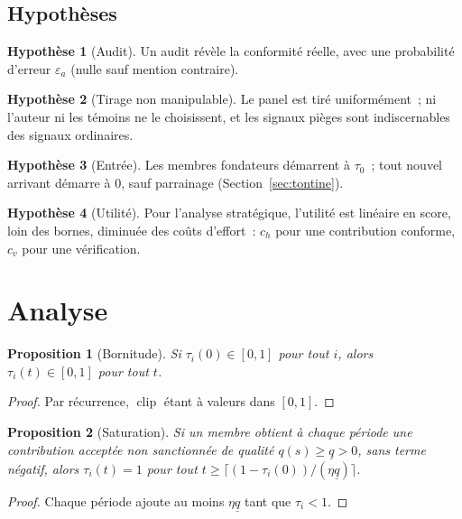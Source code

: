\documentclass[11pt,a4paper]{article}
\theoremstyle{plain}
\newtheorem{proposition}{Proposition}
\theoremstyle{definition}
\newtheorem{hypothese}{Hypothèse}
\theoremstyle{remark}
\newcommand{\clip}{\operatorname{clip}}
\newcommand{\1}{\mathbf{1}}
\begin{document}
\subsection{Hypothèses}

\begin{hypothese}[Audit]\label{h:audit}
Un audit révèle la conformité réelle, avec une probabilité d'erreur
$\varepsilon_a$ (nulle sauf mention contraire).
\end{hypothese}
\begin{hypothese}[Tirage non manipulable]\label{h:tirage}
Le panel est tiré uniformément~; ni l'auteur ni les témoins ne le choisissent,
et les signaux pièges sont indiscernables des signaux ordinaires.
\end{hypothese}
\begin{hypothese}[Entrée]\label{h:entree}
Les membres fondateurs démarrent à $\tau_0$~; tout nouvel arrivant démarre à 0,
sauf parrainage (Section~\ref{sec:tontine}).
\end{hypothese}
\begin{hypothese}[Utilité]\label{h:lin}
Pour l'analyse stratégique, l'utilité est linéaire en score, loin des bornes,
diminuée des coûts d'effort~: $c_h$ pour une contribution conforme, $c_v$ pour
une vérification.
\end{hypothese}

\section{Analyse}
\label{sec:analyse}

\begin{proposition}[Bornitude]
Si $\tau_i(0)\in[0,1]$ pour tout $i$, alors $\tau_i(t)\in[0,1]$ pour tout $t$.
\end{proposition}
\begin{proof}
Par récurrence, $\clip$ étant à valeurs dans $[0,1]$.
\end{proof}

\begin{proposition}[Saturation]\label{prop:sat}
Si un membre obtient à chaque période une contribution acceptée non
sanctionnée de qualité $q(s)\ge\underline q>0$, sans terme négatif, alors
$\tau_i(t)=1$ pour tout $t\ge\lceil(1-\tau_i(0))/(\eta\underline q)\rceil$.
\end{proposition}
\begin{proof}
Chaque période ajoute au moins $\eta\underline q$ tant que $\tau_i<1$.
\end{proof}
\end{document}
